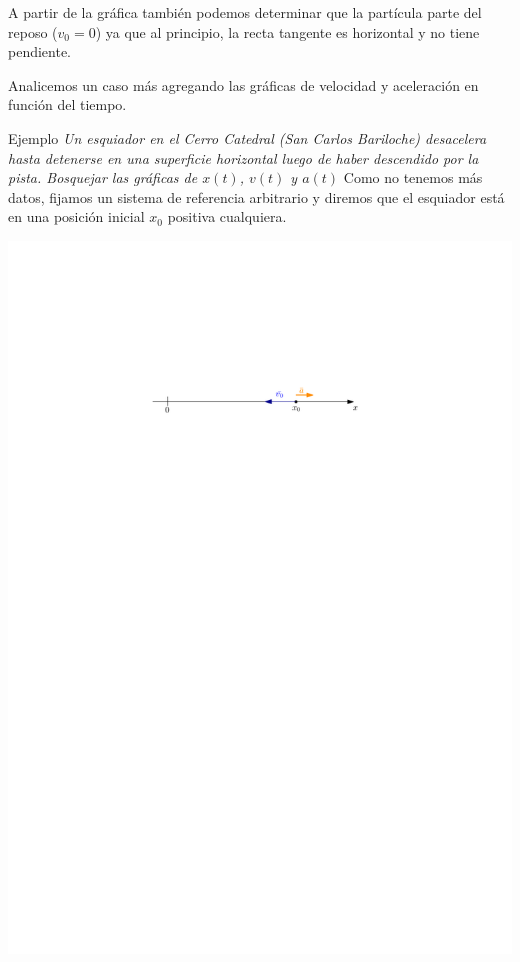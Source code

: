 A partir de la gráfica también podemos determinar que la partícula parte del reposo ($v_0=0$) ya que al principio, la recta tangente es horizontal y no tiene pendiente.

Analicemos un caso más agregando las gráficas de velocidad y aceleración en función del tiempo.

\begin{example}{Ejemplo}
    {\it Un esquiador en el Cerro Catedral (San Carlos Bariloche) desacelera hasta detenerse en una superficie horizontal luego de haber descendido por la pista. Bosquejar las gráficas de $x(t)$, $v(t)$ y $a(t)$}
\tcblower
Como no tenemos más datos, fijamos un sistema de referencia arbitrario y diremos que el esquiador está en una posición inicial $x_0$ positiva cualquiera. 

  \begin{center}
    \includegraphics[]{img/esquiador.pdf}
  \end{center}


\end{example}
